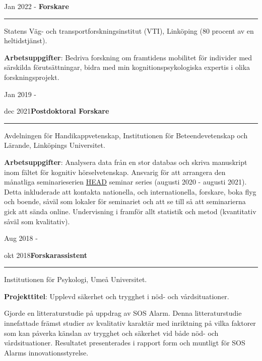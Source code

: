 \documentclass[]{article}
\begin{document}
Jan 2022 - \hspace{0.50cm}\textbf{Forskare}\vspace{1mm}

\hrule
\begin{changemargin}{2.3cm}{2.4cm}

Statens Väg- och transportforskningsinstitut (VTI), Linköping (80 procent av en heltidstjänst).

\textbf{Arbetsuppgifter}: Bedriva forskning om framtidens mobilitet för individer med särskilda förutsättningar, bidra med min kognitionspsykologiska expertis i olika forskningsprojekt.

\end{changemargin}

Jan 2019 -

dec 2021\hspace{0.75cm}\textbf{Postdoktoral Forskare}\vspace{1mm}

\hrule
\begin{changemargin}{2.3cm}{2.4cm}

Avdelningen för Handikappvetenskap, Institutionen för Beteendevetenskap och Lärande, Linköpings Universitet.

\textbf{Arbetsuppgifter}: Analysera data från en stor databas och skriva manuskript inom fältet för kognitiv hörselvetenskap. Ansvarig för att arrangera den månatliga seminarieserien \href{https://liu.se/linnecentrum-head/en}{HEAD} seminar series (augusti 2020 - augusti 2021). Detta inkluderade att kontakta nationella, och internationella, forskare, boka flyg och boende, såväl som lokaler för seminariet och att se till så att seminarierna gick att sända online. Undervisning i framför allt statistik och metod (kvantitativ såväl som kvalitativ).

\end{changemargin}

Aug 2018 -

okt 2018\hspace{0.75cm}\textbf{Forskarassistent}\vspace{1mm}

\hrule
\begin{changemargin}{2.3cm}{2.4cm}

Institutionen för Psykologi, Umeå Universitet.

\textbf{Projekttitel}: Upplevd säkerhet och trygghet i nöd- och vårdsituationer.

Gjorde en litteraturstudie på uppdrag av SOS Alarm. Denna litteraturstudie innefattade främst studier av kvalitativ karaktär med inriktning på vilka faktorer som kan påverka känslan av trygghet och säkerhet vid både nöd- och vårdsituationer. Resultatet presenterades i rapport form och muntligt för SOS Alarms innovationsstyrelse.

\end{changemargin}
\end{document}
